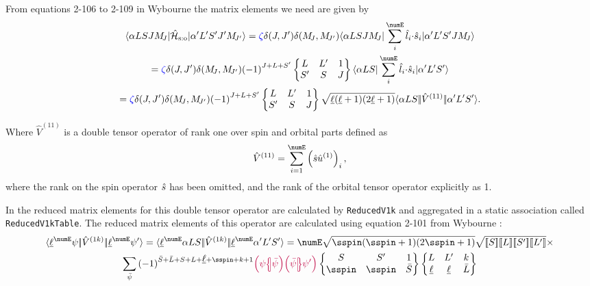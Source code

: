 \documentclass{article}
\newcommand{\codetext}[1]{{\color{BlueViolet} \texttt{#1}}}
\begin{document}
    From equations 2-106 to 2-109 in Wybourne \cite{wybourne_electrostatic_1963} the matrix elements we need are given by
    \begin{multline} 
        \braopket{\alpha LSJ \Msub{J} }{\hamSpinOrbitSymbol}{\alpha' L'S'J'\Msub{J'}} = 
        \spinZeta
        \kronecker{J}{J'}
        \kronecker{\Msub{J}}{\Msub{J'}}
        \braopket{\alpha LSJ \Msub{J} }{\sum_i^{\numE} \dotp{\op{l}_i}{\op{s}_i}}{\alpha' L'S'J\Msub{J}} \\ 
        = \spinZeta \kronecker{J}{J'}
        \kronecker{\Msub{J}}{\Msub{J'}} \phaser{J+L+S'} 
            \sixj{L}{L'}{1}{S'}{S}{J} 
            \braopket{\alpha LS}{\sum_i^{\numE} \dotp{\op{l}_i}{\op{s}_i}}{\alpha' L'S'} \\
        = \spinZeta \kronecker{J}{J'}
        \kronecker{\Msub{J}}{\Msub{J'}} \phaser{J+L+S'} 
            \sixj{L}{L'}{1}{S'}{S}{J} 
            \sqrt{\lorb (\lorb + 1)(2\lorb + 1)} 
            \redbraopket{\alpha{LS}}{\op{V}^{(11)}}{\alpha'L'S'}.
    \end{multline}

    Where $\hat{V}^{(11)}$ is a double tensor operator of rank one over spin and orbital parts defined as 
    \begin{equation}
        \op{V}^{(11)} = \sum_{i=1}^\numE \left( \op{s}\op{u}^{(1)} \right)_i,
    \end{equation}
    where the rank on the spin operator $\hat{s}$ has been omitted, and the rank of the orbital tensor operator explicitly as 1.

    In \qlanth the reduced matrix elements for this double tensor operator are calculated by \codetext{ReducedV1k} and aggregated in a static association called \codetext{ReducedV1kTable}. The reduced matrix elements of this operator are calculated using equation 2-101 from Wybourne \cite{wybourne_spectroscopic_1965}:
    \begin{multline} 
        \redbraopket{\lorb^\numE \psi}{\op{V}^{(1k)}}{\lorb^\numE \psi'} = 
            \redbraopket{\lorb^\numE \alpha L S}
                {\op{V}^{(1k)}}
                {\lorb^\numE \alpha'L'S'} =
            \numE 
                \sqrt{\sspin (\sspin + 1) (2\sspin + 1)}
                \sqrt{\tpobraket{S}\tpobraket{L}\tpobraket{S'}\tpobraket{L'}} \times \\
        \sum_{\bar{\psi}}
            \phaser{\bar{S} + \bar{L} + S + L + \lorb + \sspin + k + 1}
            \cfpinv{\psi}{\bar{\psi}}
            \cfp{\bar{\psi}}{\psi'}
            \sixj{S}     {S'}     {1}
                {\sspin} {\sspin} {\bar{S}}
            \sixj{L}     {L'}    {k}
                {\lorb} {\lorb} {\bar{L}}
    \label{eqn:reducedV1k}
    \end{multline}
\end{document}

